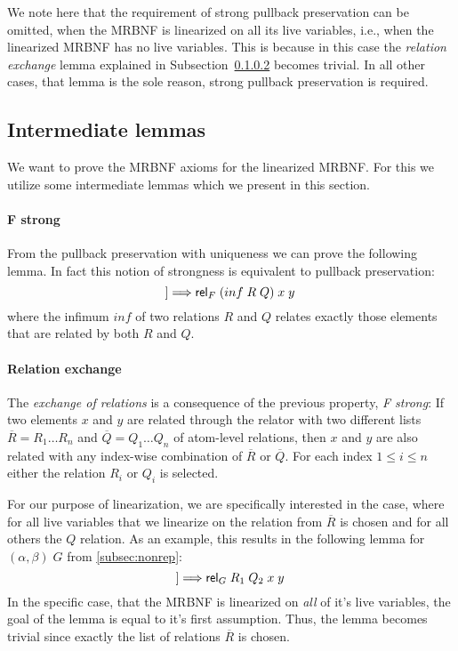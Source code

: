     We note here that the requirement of strong pullback preservation can be omitted, when the \ac{MRBNF} is linearized on all its live variables, i.e., when the linearized \ac{MRBNF} has no live variables. This is because in this case the \textit{relation exchange} lemma explained in Subsection~\ref{par:rel_exchange} becomes trivial. In all other cases, that lemma is the sole reason, strong pullback preservation is required.

  \subsection{Intermediate lemmas}
    We want to prove the \ac{MRBNF} axioms for the linearized \ac{MRBNF}. For this we utilize some intermediate lemmas which we present in this section.
    
    \paragraph{F strong}
      From the pullback preservation with uniqueness we can prove the following lemma. In fact this notion of strongness is equivalent to pullback preservation: 
      \begin{equation*}
        [\![\text{\textsf{rel}}_F\; R\; x\; y;\; \text{\textsf{rel}}_F\; Q\; x\; y]\!] \Longrightarrow \text{\textsf{rel}}_F\; (inf\; R\; Q)\; x\; y
      \end{equation*} 
      where the infimum $inf$ of two relations $R$ and $Q$ relates exactly those elements that are related by both $R$ and $Q$.

    \paragraph{Relation exchange}
    \label{par:rel_exchange}
      The \textit{exchange of relations} is a consequence of the previous property, \textit{F strong}: If two elements $x$ and $y$ are related through the relator with two different lists $\overline{R} = R_1 \dots R_n$ and $\overline{Q} = Q_1 \dots Q_n$ of atom-level relations, then $x$ and $y$ are also related with any index-wise combination of $\overline{R}$ or $\overline{Q}$. For each index $1 \leq i \leq n$ either the relation $R_i$ or $Q_i$ is selected. 
      
      For our purpose of linearization, we are specifically interested in the case, where for all live variables that we linearize on the relation from $\overline{R}$ is chosen and for all others the $Q$ relation. As an example, this results in the following lemma for $(\alpha, \beta)\; G$ from \autoref{subsec:nonrep}:
      \begin{equation*}
        [\![\text{\textsf{rel}}_G\; R_1\; R_2\; x\; y;\; \text{\textsf{rel}}_G\; Q_1\; Q_2\; x\; y]\!] \Longrightarrow \text{\textsf{rel}}_G\; R_1\; Q_2\; x\; y
      \end{equation*} 
      In the specific case, that the \ac{MRBNF} is linearized on \textit{all} of it's live variables, the goal of the lemma is equal to it's first assumption. Thus, the lemma becomes trivial since exactly the list of relations $\overline{R}$ is chosen.

